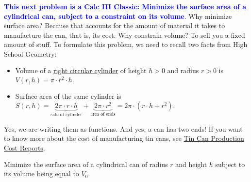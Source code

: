 \textcolor{blue}{\bf This next problem is a Calc III Classic: Minimize the surface area of a cylindrical can, subject to a constraint on its volume}. Why minimize surface area? Because that accounts for the amount of material it takes to manufacture the can, that is, its cost. Why constrain volume? To sell you a fixed amount of stuff. To formulate this problem, we need to recall two facts from High School Geometry:
\begin{itemize}
    \item Volume of a \href{https://byjus.com/maths/right-circular-cylinder/}{right circular cylinder} of height $h>0$ and radius $r>0$ is $V(r, h) = \pi \cdot r^2 \cdot h$.
    \item Surface area of the same cylinder is $S(r, h) = \underbrace{2 \pi \cdot r \cdot h}_{\text{side of cylinder}} + \underbrace{2 \pi \cdot r^2}_{\text{area of ends}} = 2 \pi \cdot (r \cdot h + r^2)$.
\end{itemize}
Yes, we are writing them as functions. And yes, a can has two ends! If you want to know more about the cost of manufacturing tin cans, see \href{https://www.procurementresource.com/production-cost-report-store/tin-can}{Tin Can Production Cost Reports}. 

\bigskip
\begin{example} Minimize the surface area of a cylindrical can of radius $r$ and height $h$ subject to its volume being equal to $V_0$.    
\end{example}

